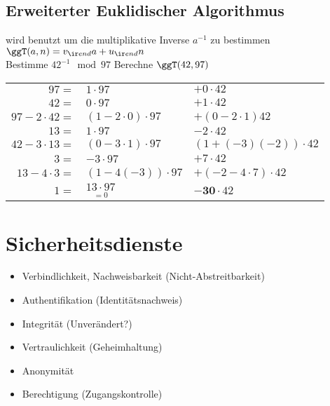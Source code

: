 \documentclass[fs]{latex4ei}
\begin{document}
\begin{multicols}{4}
	\subsection{Erweiterter Euklidischer Algorithmus}	
	wird benutzt um die multiplikative Inverse $a^{-1}$ zu bestimmen\\
	$\ggT(a,n) = v_{\ir end} a + u_{\ir end} n$\\	
	Bestimme $42^{-1} \mod 97$ \qquad Berechne $\ggT(42,97)$\\
	\begin{tabular}{@{}rll@{}}
		$97 =$ & $1 \cdot 97$ & $+ 0 \cdot 42$\\
		$42 =$ & $0 \cdot 97$ & $+ 1 \cdot 42$\\ \mrule
		$97 - 2\cdot 42 =$ & $(1-2\cdot 0) \cdot 97$ & $+ (0 - 2 \cdot 1) 42$\\
		$13 =$ & $1 \cdot 97$ & $-2 \cdot 42$\\ \mrule
		$42 - 3 \cdot 13 =$ & $(0 - 3 \cdot 1) \cdot 97$ & $(1 + (-3)(-2)) \cdot 42$\\  
		$3 =$ & $-3 \cdot 97$ & $+ 7 \cdot 42$\\  \mrule
		$13 - 4 \cdot 3 =$ & $(1 - 4(-3)) \cdot 97$ & $+ (-2- 4 \cdot 7) \cdot 42$\\  
		$1 =$ & $\underset{=0}{13 \cdot 97}$ & $\boldsymbol{- 30} \cdot 42$\\  
	\end{tabular}
	
	 
	
	
\section{Sicherheitsdienste}
	\begin{itemize}\itemsep0pt
		\item Verbindlichkeit, Nachweisbarkeit (Nicht-Abstreitbarkeit)
		\item Authentifikation (Identitätsnachweis)
		\item Integrität (Unverändert?)\vspace{0.4em}
		\item Vertraulichkeit (Geheimhaltung)
		\item Anonymität\vspace{0.4em}
		\item Berechtigung (Zugangskontrolle)
	\end{itemize}
	

\end{multicols}
\end{document}
